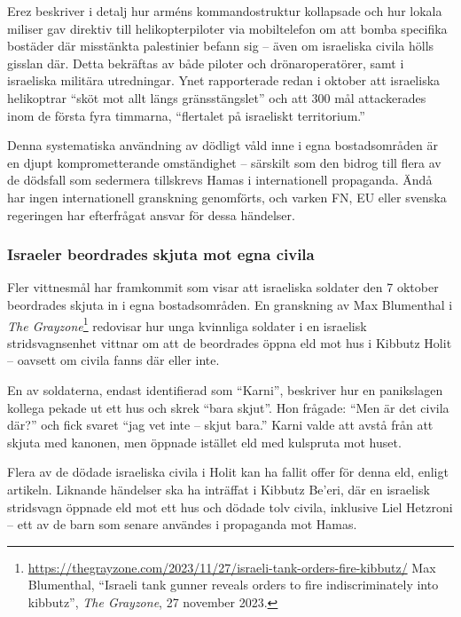 \documentclass[12pt]{article}
\begin{document}
Erez beskriver i detalj hur arméns kommandostruktur kollapsade och hur lokala miliser gav direktiv till helikopterpiloter via mobiltelefon om att bomba specifika bostäder där misstänkta palestinier befann sig – även om israeliska civila hölls gisslan där. Detta bekräftas av både piloter och drönaroperatörer, samt i israeliska militära utredningar. Ynet rapporterade redan i oktober att israeliska helikoptrar “sköt mot allt längs gränsstängslet” och att 300 mål attackerades inom de första fyra timmarna, “flertalet på israeliskt territorium.”

Denna systematiska användning av dödligt våld inne i egna bostadsområden är en djupt komprometterande omständighet – särskilt som den bidrog till flera av de dödsfall som sedermera tillskrevs Hamas i internationell propaganda. Ändå har ingen internationell granskning genomförts, och varken FN, EU eller svenska regeringen har efterfrågat ansvar för dessa händelser.

\subsubsection*{Israeler beordrades skjuta mot egna civila}

Fler vittnesmål har framkommit som visar att israeliska soldater den 7 oktober beordrades skjuta in i egna bostadsområden. En granskning av Max Blumenthal i \textit{The Grayzone}\footnote{\url{https://thegrayzone.com/2023/11/27/israeli-tank-orders-fire-kibbutz/} Max Blumenthal, “Israeli tank gunner reveals orders to fire indiscriminately into kibbutz”, \textit{The Grayzone}, 27 november 2023.} redovisar hur unga kvinnliga soldater i en israelisk stridsvagnsenhet vittnar om att de beordrades öppna eld mot hus i Kibbutz Holit – oavsett om civila fanns där eller inte. 

En av soldaterna, endast identifierad som “Karni”, beskriver hur en panikslagen kollega pekade ut ett hus och skrek “bara skjut”. Hon frågade: “Men är det civila där?” och fick svaret “jag vet inte – skjut bara.” Karni valde att avstå från att skjuta med kanonen, men öppnade istället eld med kulspruta mot huset.

Flera av de dödade israeliska civila i Holit kan ha fallit offer för denna eld, enligt artikeln. Liknande händelser ska ha inträffat i Kibbutz Be’eri, där en israelisk stridsvagn öppnade eld mot ett hus och dödade tolv civila, inklusive Liel Hetzroni – ett av de barn som senare användes i propaganda mot Hamas.
\end{document}
